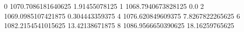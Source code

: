 0 1070.7086181640625 1.91455078125
1 1068.7940673828125 0.0
2 1069.0985107421875 0.304443359375
4 1076.620849609375 7.8267822265625
6 1082.2154541015625 13.42138671875
8 1086.9566650390625 18.16259765625
